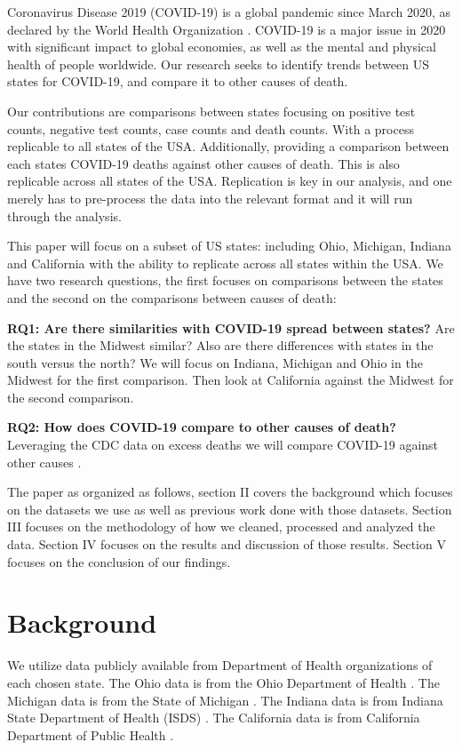 \documentclass[conference]{IEEEtran}
\begin{document}
Coronavirus Disease 2019 (COVID-19) is a global pandemic since March 2020, as declared by the World Health Organization \cite{cucinotta_who_2020}.
COVID-19 is a major issue in 2020 with significant impact to global economies, as well as the mental and physical health of people worldwide.
Our research seeks to identify trends between US states for COVID-19, and compare it to other causes of death.

Our contributions are comparisons between states focusing on positive test counts, negative test counts, case counts and death counts. 
With a process replicable to all states of the USA. 
Additionally, providing a comparison between each states COVID-19 deaths against other causes of death.
This is also replicable across all states of the USA.
Replication is key in our analysis, and one merely has to pre-process the data into the relevant format and it will run through the analysis.

This paper will focus on a subset of US states: including Ohio, Michigan, Indiana and California with the ability to replicate across all states within the USA.
We have two research questions, the first focuses on comparisons between the states and the second on the comparisons between causes of death:

\textbf{RQ1: Are there similarities with COVID-19 spread between states?} Are the states in the Midwest similar? Also are there differences with states in the south versus the north? We will focus on Indiana, Michigan and Ohio in the Midwest for the first comparison. Then look at California against the Midwest for the second comparison.

\textbf{RQ2: How does COVID-19 compare to other causes of death?} Leveraging the CDC data on excess deaths we will compare COVID-19 against other causes \cite{cdc_weekly_nodate}.


The paper as organized as follows, section II covers the background which focuses on the datasets we use as well as previous work done with those datasets.
Section III focuses on the methodology of how we cleaned, processed and analyzed the data.
Section IV focuses on the results and discussion of those results.
Section V focuses on the conclusion of our findings.

\section{Background}

We utilize data publicly available from Department of Health organizations of each chosen state.
The Ohio data is from the Ohio Department of Health \cite{system_covid-19_nodate}.
The Michigan data is from the State of Michigan \cite{noauthor_coronavirus_nodate}.
The Indiana data is from Indiana State Department of Health (ISDS) \cite{noauthor_indiana_nodate}.
The California data is from California Department of Public Health \cite{noauthor_tracking_nodate}.
\end{document}
